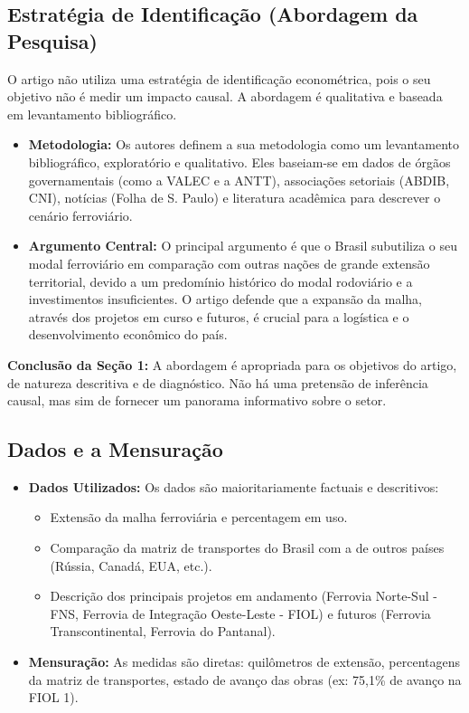 \documentclass[12pt, a4paper]{article}
\begin{document}
\subsection{Estratégia de Identificação (Abordagem da Pesquisa)}
O artigo não utiliza uma estratégia de identificação econométrica, pois o seu objetivo não é medir um impacto causal. A abordagem é qualitativa e baseada em levantamento bibliográfico.

\begin{itemize}
    \item \textbf{Metodologia:} Os autores definem a sua metodologia como um levantamento bibliográfico, exploratório e qualitativo. Eles baseiam-se em dados de órgãos governamentais (como a VALEC e a ANTT), associações setoriais (ABDIB, CNI), notícias (Folha de S. Paulo) e literatura acadêmica para descrever o cenário ferroviário.
    \item \textbf{Argumento Central:} O principal argumento é que o Brasil subutiliza o seu modal ferroviário em comparação com outras nações de grande extensão territorial, devido a um predomínio histórico do modal rodoviário e a investimentos insuficientes. O artigo defende que a expansão da malha, através dos projetos em curso e futuros, é crucial para a logística e o desenvolvimento econômico do país.
\end{itemize}

\noindent\textbf{Conclusão da Seção 1:} A abordagem é apropriada para os objetivos do artigo, de natureza descritiva e de diagnóstico. Não há uma pretensão de inferência causal, mas sim de fornecer um panorama informativo sobre o setor.

\subsection{Dados e a Mensuração}

\begin{itemize}
    \item \textbf{Dados Utilizados:} Os dados são maioritariamente factuais e descritivos:
        \begin{itemize}
            \item Extensão da malha ferroviária e percentagem em uso.
            \item Comparação da matriz de transportes do Brasil com a de outros países (Rússia, Canadá, EUA, etc.).
            \item Descrição dos principais projetos em andamento (Ferrovia Norte-Sul - FNS, Ferrovia de Integração Oeste-Leste - FIOL) e futuros (Ferrovia Transcontinental, Ferrovia do Pantanal).
        \end{itemize}
    \item \textbf{Mensuração:} As medidas são diretas: quilômetros de extensão, percentagens da matriz de transportes, estado de avanço das obras (ex: 75,1\% de avanço na FIOL 1).
\end{itemize}
\end{document}
